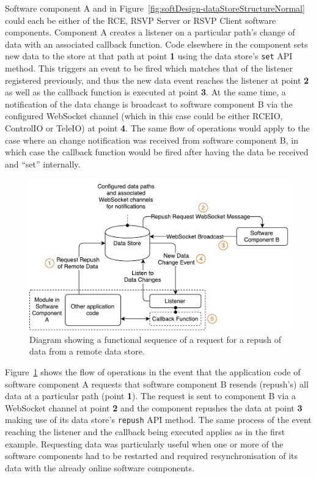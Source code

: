         Software component A and in Figure~\ref{fig:softDesign-dataStoreStructureNormal} could each be either of the RCE, RSVP Server or RSVP Client software components. Component A creates a listener on a particular path's change of data with an associated callback function. Code elsewhere in the component sets new data to the store at that path at point \textbf{1} using the data store's \texttt{set} API method. This triggers an event to be fired which matches that of the listener registered previously, and thus the new data event reaches the listener at point \textbf{2} as well as the callback function is executed at point \textbf{3}. At the same time, a notification of the data change is broadcast to software component B via the configured WebSocket channel (which in this case could be either RCEIO, ControlIO or TeleIO) at point \textbf{4}. The same flow of operations would apply to the case where an change notification was received from software component B, in which case the callback function would be fired after having the data be received and ``set'' internally.
        
        \begin{figure}[h!]
          \centering
          \includegraphics[width=0.8\linewidth]{figures/softDesign-dataStoreStructureRepushRequest}
          \caption[Diagram showing a functional sequence of a request for a repush of data from a remote data store.]{Diagram showing a functional sequence of a request for a repush of data from a remote data store.}
          \label{fig:softDesign-dataStoreStructureRepushRequest}
        \end{figure}        
        
        Figure~\ref{fig:softDesign-dataStoreStructureRepushRequest} shows the flow of operations in the event that the application code of software component A requests that software component B resends (repush's) all data at a particular path (point \textbf{1}). The request is sent to component B via a WebSocket channel at point \textbf{2} and the component repushes the data at point \textbf{3} making use of its data store's \texttt{repush} API method. The same process of the event reaching the listener and the callback being executed applies as in the first example. Requesting data was particularly useful when one or more of the software components had to be restarted and required resynchronisation of its data with the already online software components.
        
